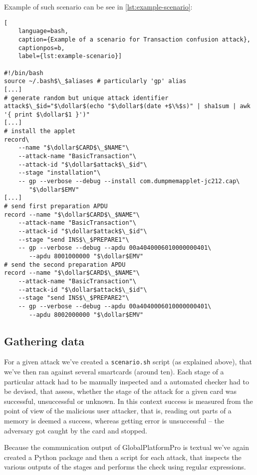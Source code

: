 \documentclass[a4paper]{scrartcl}
\newcommand{\dollar}{\mbox{\textdollar}}
\begin{document}
Example of such scenario can be see in \ref{lst:example-scenario}:
\begin{lstlisting}[
    language=bash,
    caption={Example of a scenario for Transaction confusion attack},
    captionpos=b,
    label={lst:example-scenario}]

#!/bin/bash
source ~/.bash$\_$aliases # particularly 'gp' alias
[...]
# generate random but unique attack identifier
attack$\_$id="$\dollar$(echo "$\dollar$(date +$\%$s)" | sha1sum | awk '{ print $\dollar$1 }')"
[...]
# install the applet
record\
    --name "$\dollar$CARD$\_$NAME"\
    --attack-name "BasicTransaction"\
    --attack-id "$\dollar$attack$\_$id"\
    --stage "installation"\
    -- gp --verbose --debug --install com.dumpmemapplet-jc212.cap\
       "$\dollar$EMV"
[...]
# send first preparation APDU
record --name "$\dollar$CARD$\_$NAME"\
    --attack-name "BasicTransaction"\
    --attack-id "$\dollar$attack$\_$id"\
    --stage "send INS$\_$PREPARE1"\
    -- gp --verbose --debug --apdu 00a4040006010000000401\
       --apdu 8001000000 "$\dollar$EMV"
# send the second preparation APDU
record --name "$\dollar$CARD$\_$NAME"\
    --attack-name "BasicTransaction"\
    --attack-id "$\dollar$attack$\_$id"\
    --stage "send INS$\_$PREPARE2"\
    -- gp --verbose --debug --apdu 00a4040006010000000401\
       --apdu 8002000000 "$\dollar$EMV"
\end{lstlisting}

\subsection{Gathering data}

For a given attack we've created a \texttt{scenario.sh} script (as explained above), that we've then ran against several smartcards (around ten). Each stage of a particular attack had to be manually inspected and a automated checker had to be devised, that assess, whether the stage of the attack for a given card was successful, unsuccessful or unknown. In this context success is measured from the point of view of the malicious user attacker, that is, reading out parts of a memory is deemed a success, whereas getting error is unsuccessful -- the adversary got caught by the card and stopped.

Because the communication output of GlobalPlatformPro is textual we've again created a Python package and then a script for each attack, that inspects the various outputs of the stages and performs the check using regular expressions.
\end{document}
